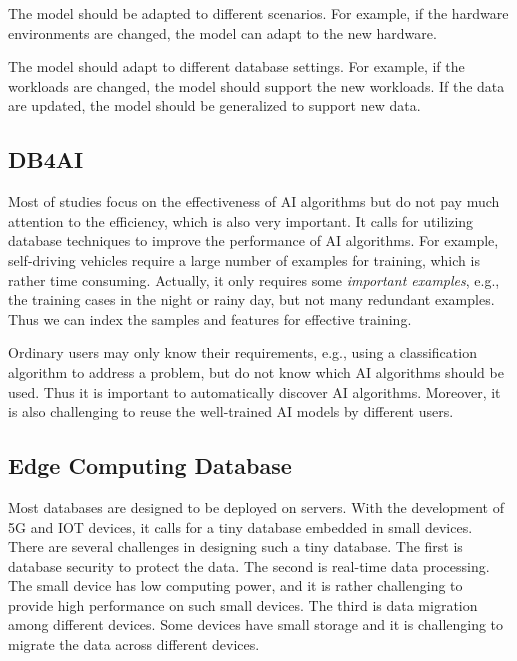  The model should be adapted to different scenarios. For example, if the hardware environments are changed, the model can adapt to the new hardware. 
  
 The model should adapt to different database settings. For example, if the workloads are changed, the model should support the new workloads. If the data are updated, the model should be generalized to support new data. 
 

\subsection{DB4AI}

 Most of studies focus on the effectiveness of AI algorithms but do not pay much attention to the efficiency, which is also very important. It calls for utilizing database techniques to improve the performance of AI algorithms. For example, self-driving vehicles require a large number of examples for training, which is rather time consuming. Actually, it only requires some {\it important examples}, e.g., the training cases in the night or rainy day, but not many redundant examples. Thus we can index the samples and features for effective training. 


 Ordinary users may only know their requirements, e.g., using a classification algorithm to address a problem, but do not know which AI algorithms should be used. Thus it is important to automatically discover AI algorithms. Moreover, it is also challenging to reuse the well-trained AI models by different users. 



\subsection{Edge Computing Database} 

Most databases are designed to be deployed on servers. With the development of 5G and IOT devices, it calls for a tiny database embedded in small devices. There are several challenges in designing such a tiny database. The first is database  security to protect the data. The second is real-time data processing. The small device has low computing power, and it is rather challenging to provide high performance on such small devices. The third is data migration among different devices. Some devices have small storage and it is challenging to migrate the data across different devices. 



